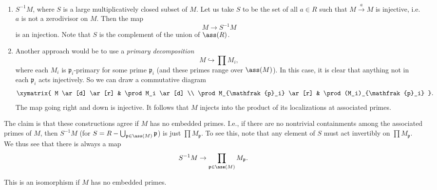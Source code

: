 \begin{enumerate}
\item  $S^{-1}M$, where $S$ is a large multiplicatively closed subset of $M$.
Let us take $S $ to be the set of all $a \in R$ such that $M
\stackrel{a}{\to}M$ is injective, i.e. $a$ is not a zerodivisor on $M$. Then
the map 
\[ M \to S^{-1}M  \]
is an injection. Note that $S$ is the complement of the union of $\ass(R)$.
\item Another approach would be to use a \emph{primary decomposition}
\[ M \hookrightarrow \prod M_i,  \]
where each $M_i$ is $\mathfrak{p}_i$-primary for some prime $\mathfrak{p}_i$
(and these primes range over $\ass(M)$). In this case, it is clear that
anything not in each $\mathfrak{p}_i$ acts injectively. So we can draw a
commutative diagram
\[ 
\xymatrix{
M \ar[d]  \ar[r] &  \prod M_i \ar[d]  \\
\prod M_{\mathfrak{p}_i} \ar[r] &  \prod (M_i)_{\mathfrak{p}_i}
}.
\]
The map going right and down is injective.
It follows that $M$ injects into the product of its localizations at associated
primes. 
\end{enumerate}

The claim is that these constructions agree if $M$ has no embedded primes.
I.e., if there are no nontrivial containments among the associated primes of
$M$, then $S^{-1}M$ (for $S =  R - \bigcup_{\mathfrak{p} \in \ass(M)} \mathfrak{p}$)
is just $\prod M_{\mathfrak{p}}$. 
To see this, note that any element of $S$ must act invertibly on $\prod
M_{\mathfrak{p}}$. We thus see that there is always a map
\[ S^{-1}M \to \prod_{\mathfrak{p} \in \ass(M)} M_{\mathfrak{p}} . \]
\begin{proposition} 
This is an isomorphism if $M$ has no embedded primes. 
\end{proposition} 

